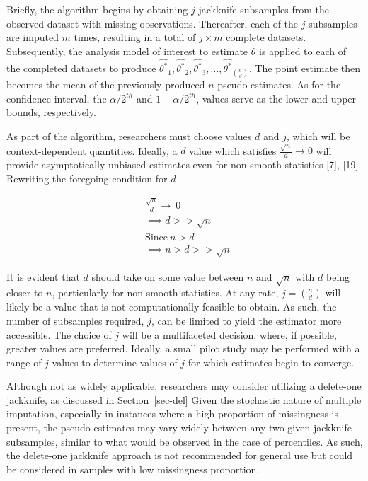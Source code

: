 \documentclass[
  letterpaper,
  DIV=11,
  numbers=noendperiod]{scrreprt}
\begin{document}
Briefly, the algorithm begins by obtaining \(j\) jackknife subsamples
from the observed dataset with missing observations. Thereafter, each of
the \(j\) subsamples are imputed \(m\) times, resulting in a total of
\(j \times m\) complete datasets. Subsequently, the analysis model of
interest to estimate \(\theta\) is applied to each of the completed
datasets to produce
\(\hat{\theta^*}_1, \hat{\theta^*}_2, \hat{\theta^*}_3, \dots, \hat{\theta^*}_{n \choose d}\).
The point estimate then becomes the mean of the previously produced
\(n\) pseudo-estimates. As for the confidence interval, the
\(\alpha/2^{th}\) and \(1-\alpha/2^{th}\), values serve as the lower and
upper bounds, respectively.

As part of the algorithm, researchers must choose values \(d\) and
\(j\), which will be context-dependent quantities. Ideally, a \(d\)
value which satisfies \(\frac{\sqrt{n}}{d} \rightarrow 0\) will provide
asymptotically unbiased estimates even for non-smooth statistics
{[}7{]}, {[}19{]}. Rewriting the foregoing condition for \(d\)

\begin{align}
&\frac{\sqrt{n}}{d} \rightarrow \ 0 \\ 
&\implies d >> \sqrt{n} \\ 
&\text{Since} \ n > d \\
&\implies n > d >> \sqrt{n}
\end{align}

It is evident that \(d\) should take on some value between \(n\) and
\(\sqrt{n}\) with \(d\) being closer to \(n\), particularly for
non-smooth statistics. At any rate, \(j = {n \choose d}\) will likely be
a value that is not computationally feasible to obtain. As such, the
number of subsamples required, \(j\), can be limited to yield the
estimator more accessible. The choice of \(j\) will be a multifaceted
decision, where, if possible, greater values are preferred. Ideally, a
small pilot study may be performed with a range of \(j\) values to
determine values of \(j\) for which estimates begin to converge.

Although not as widely applicable, researchers may consider utilizing a
delete-one jackknife, as discussed in Section~\ref{sec-del} Given the
stochastic nature of multiple imputation, especially in instances where
a high proportion of missingness is present, the pseudo-estimates may
vary widely between any two given jackknife subsamples, similar to what
would be observed in the case of percentiles. As such, the delete-one
jackknife approach is not recommended for general use but could be
considered in samples with low missingness proportion.
\end{document}
